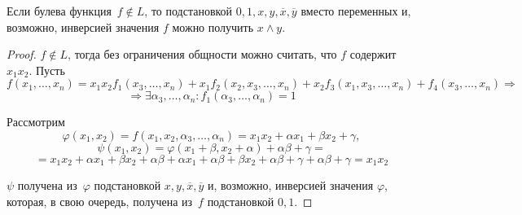 \begin{lemma}
Если булева функция~$f \notin L$, то подстановкой $0, 1, x, y, \overline x, \overline y$ вместо переменных и, возможно, инверсией значения $f$ можно получить $x \land y$.
\end{lemma}
\begin{proof}
$f \notin L$, тогда без ограничения общности можно считать, что $f$ содержит $x_1 x_2$.
Пусть
\begin{equation*}
f(x_1, \ldots, x_n) = x_1 x_2 f_1(x_3, \ldots, x_n) + x_1 f_2(x_2, x_3, \ldots, x_n) + x_2 f_3(x_1, x_3, \ldots, x_n) + f_4(x_3, \ldots, x_n) \Rightarrow
\end{equation*}
\begin{equation*}
\Rightarrow \exists \alpha_3, \ldots, \alpha_n \colon f_1(\alpha_3, \ldots, \alpha_n) = 1
\end{equation*}

Рассмотрим
\begin{equation*}
\varphi(x_1, x_2) = f(x_1, x_2, \alpha_3, \ldots, \alpha_n) = x_1 x_2 + \alpha x_1 + \beta x_2 + \gamma,
\end{equation*}
\begin{equation*}
\psi(x_1, x_2) = \varphi(x_1 + \beta, x_2 + \alpha) + \alpha\beta + \gamma =
\end{equation*}
\begin{equation*}
= x_1 x_2 + \alpha x_1 + \beta x_2 + \alpha\beta + \alpha x_1 + \alpha\beta + \beta x_2 + \alpha\beta + \gamma + \alpha\beta + \gamma =
x_1 x_2
\end{equation*}

$\psi$ получена из~$\varphi$ подстановкой $x, y, \overline x, \overline y$ и, возможно, инверсией значения $\varphi$, которая, в свою очередь, получена из~$f$ подстановкой $0, 1$.
\end{proof}